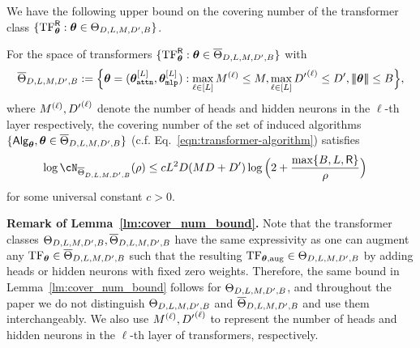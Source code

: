 We have the following upper bound on the covering number of the transformer class $\{{\rm TF}^{\mathsf{R}}_{{{\boldsymbol \theta}}}:{{\boldsymbol \theta}}\in{\Theta}_{D, {L},{M},{D'},{B}}\}$.  %
\begin{lemma}\label{lm:cover_num_bound}
For the space of transformers $\{{\rm TF}^{\mathsf{R}}_{{{\boldsymbol \theta}}}:{{\boldsymbol \theta}}\in\overline{{\Theta}}_{D, {L},{M},{D'},{B}}\}$ with 
\begin{align*}
\overline{{\Theta}}_{D, {L},{M},{D'},{B}}:= \Big\{{{\boldsymbol \theta}}=({{\boldsymbol \theta}}^{[{L}]}_{\tt attn},{{\boldsymbol \theta}}^{[{L}]}_{\tt mlp}):\max_{\ell\in[{L}]}{M}^{(\ell)}\leq {M}, \max_{\ell\in[{L}]}{D'}^{(\ell)}\leq {D'}, {\left|\!\left|\!\left|{{{\boldsymbol \theta}}}\right|\!\right|\!\right|}\leq{B} \Big\}, 
\end{align*}where ${M}^{(\ell)},{D'}^{(\ell)}$ denote the number  of heads and hidden neurons in the $\ell$-th layer respectively, the covering number of the set of induced algorithms $\{{\mathsf{Alg}}_{{\boldsymbol \theta}},{{\boldsymbol \theta}}\in\overline{{\Theta}}_{D, {L},{M},{D'},{B}}\}$ (c.f. Eq.~\ref{eqn:transformer-algorithm}) satisfies
\begin{align*}
    \log \cN_{\bar{\tfparspace}_{D, \layer,\head,\hidden,\normb}}(\rho)
    &\leq c\layer^2\embd(\head\embd+\hidden)\log\Big(2+\frac{\max\{\normb,\layer,\clipval\}}{\rho}\Big)
\end{align*} for some universal constant $c>0$. 


\end{lemma}
\textbf{Remark of Lemma~\ref{lm:cover_num_bound}.} Note that the transformer classes ${{\Theta}}_{D, {L},{M},{D'},{B}},\overline{{\Theta}}_{D, {L},{M},{D'},{B}}$ have the same expressivity as one can augment any ${\rm TF}_{{\boldsymbol \theta}}\in \overline{{\Theta}}_{D, {L},{M},{D'},{B}}$ such that the resulting ${\rm TF}_{{{\boldsymbol \theta}},\mathrm{aug}}\in{{\Theta}}_{D, {L},{M},{D'},{B}}$ by adding heads or hidden neurons with fixed zero weights. Therefore, the same bound in Lemma~\ref{lm:cover_num_bound} follows for ${{\Theta}}_{D, {L},{M},{D'},{B}}$, and  throughout the paper we do not distinguish ${{\Theta}}_{D, {L},{M},{D'},{B}}$ and $\overline{{\Theta}}_{D, {L},{M},{D'},{B}}$ and use them interchangeably. We also use ${M}^{(\ell)},{D'}^{(\ell)}$ to  represent the number  of heads and hidden neurons in the $\ell$-th layer of transformers, respectively. 

